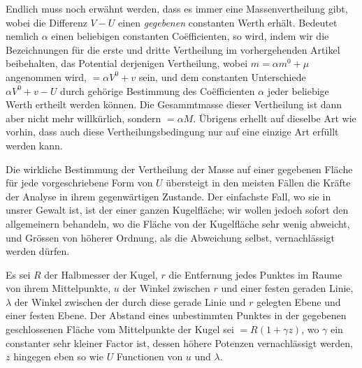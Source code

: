 Endlich muss noch erwähnt werden, dass es immer eine Massenvertheilung gibt, wobei die Differenz $V-U$ einen \textit{gegebenen} constanten Werth erhält. Bedeutet nemlich $\alpha$ einen beliebigen constanten Coëfficienten, so wird, indem wir die Bezeichnungen für die erste und dritte Vertheilung im vorhergehenden Artikel beibehalten, das Potential derjenigen Vertheilung, wobei $m=\alpha m^0+\mu$ angenommen wird, $=\alpha V^0+v$ sein, und dem constanten Unterschiede $\alpha V^0+v-U$ durch gehörige Bestimmung des Coëfficienten $\alpha$ jeder beliebige Werth ertheilt werden können. Die Gesammtmasse dieser Vertheilung ist dann aber nicht mehr willkürlich, sondern $=\alpha M$. Übrigens erhellt auf dieselbe Art wie vorhin, dass auch diese Vertheilungsbedingung nur auf eine einzige Art erfüllt werden kann.

Die wirkliche Bestimmung der Vertheilung der Masse auf einer gegebenen Fläche für jede vorgeschriebene Form von $U$ übersteigt in den meisten Fällen die Kräfte der Analyse in ihrem gegenwärtigen Zustande. Der einfachste Fall, wo sie in unsrer Gewalt ist, ist der einer ganzen Kugelfläche; wir wollen jedoch sofort den allgemeinern behandeln, wo die Fläche von der Kugelfläche sehr wenig abweicht, und Grössen von höherer Ordnung, als die Abweichung selbst, vernachlässigt werden dürfen.

Es sei $R$ der Halbmesser der Kugel, $r$ die Entfernung jedes Punktes im Raume von ihrem Mittelpunkte, $u$ der Winkel zwischen $r$ und einer festen geraden Linie, $\lambda$ der Winkel zwischen der durch diese gerade Linie und $r$ gelegten Ebene und einer festen Ebene. Der Abstand eines unbestimmten Punktes in der gegebenen geschlossenen Fläche vom Mittelpunkte der Kugel sei $=R(1+\gamma z)$, wo $\gamma$ ein constanter sehr kleiner Factor ist, dessen höhere Potenzen vernachlässigt werden, $z$ hingegen eben so wie $U$ Functionen von $u$ und $\lambda$.

